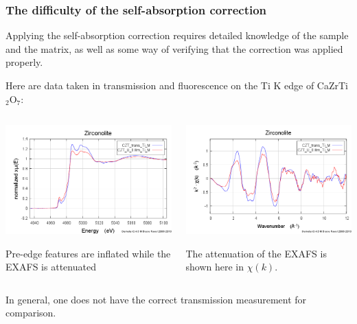 \documentclass[10pt, xcolor=x11names, compress]{beamer}
\begin{document}
\begin{frame}
  \frametitle{The difficulty of the self-absorption correction}
  \small
  Applying the self-absorption correction requires detailed knowledge
  of the sample and the matrix, as well as some way of verifying that
  the correction was applied properly.

  \bigskip

  Here are data taken in transmission and fluorescence on the Ti K
  edge of CaZrTi$_2$O$_7$:

  \begin{columns}
    \begin{column}{0.5\linewidth}
      \includegraphics[width=0.9\linewidth]{sample/zirc_xanes.png}

      Pre-edge features are inflated while the EXAFS is attenuated
    \end{column}
    \begin{column}{0.5\linewidth}
      \includegraphics[width=0.9\linewidth]{sample/zirc_chik.png}

      The attenuation of the EXAFS is shown here in $\chi(k)$.
    \end{column}
  \end{columns}

  \bigskip

  In general, one does not have the correct transmission measurement
  for comparison.
\end{frame}
\end{document}
